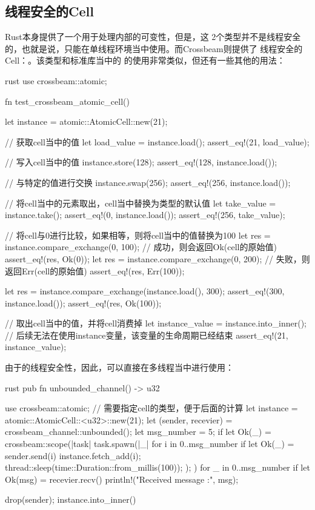 \subsection{线程安全的Cell}
Rust本身提供了一个用于处理内部的可变性，但是，这
2个类型并不是线程安全的，也就是说，只能在单线程环境当中使用。而Crossbeam则提供了
线程安全的Cell：。该类型和标准库当中的
的使用非常类似，但还有一些其他的用法：
\begin{code-block}{rust}
use crossbeam::atomic;

fn test_crossbeam_atomic_cell() {
    let instance = atomic::AtomicCell::new(21);

    // 获取cell当中的值
    let load_value = instance.load();
    assert_eq!(21, load_value);

    // 写入cell当中的值
    instance.store(128);
    assert_eq!(128, instance.load());

    // 与特定的值进行交换
    instance.swap(256);
    assert_eq!(256, instance.load());

    // 将cell当中的元素取出，cell当中替换为类型的默认值
    let take_value = instance.take();
    assert_eq!(0, instance.load());
    assert_eq!(256, take_value);

    // 将cell与0进行比较，如果相等，则将cell当中的值替换为100
    let res = instance.compare_exchange(0, 100);
    // 成功，则会返回Ok(cell的原始值)
    assert_eq!(res, Ok(0));
    let res = instance.compare_exchange(0, 200);
    // 失败，则返回Err(cell的原始值)
    assert_eq!(res, Err(100));

    let res = instance.compare_exchange(instance.load(), 300);
    assert_eq!(300, instance.load());
    assert_eq!(res, Ok(100));

    // 取出cell当中的值，并将cell消费掉
    let instance_value = instance.into_inner();
    // 后续无法在使用instance变量，该变量的生命周期已经结束
    assert_eq!(21, instance_value);
}
\end{code-block}

由于的线程安全性，因此，可以直接在多线程当中进行使用：
\begin{code-block}{rust}
pub fn unbounded_channel() -> u32 {
    use crossbeam::atomic;
    // 需要指定cell的类型，便于后面的计算
    let instance = atomic::AtomicCell::<u32>::new(21);
    let (sender, recevier) = crossbeam_channel::unbounded();
    let msg_number = 5;
    if let Ok(_) = crossbeam::scope(|task| {
        task.spawn(|_| {
            for i in 0..msg_number {
                if let Ok(_) = sender.send(i) {
                    instance.fetch_add(i);
                    thread::sleep(time::Duration::from_millis(100));
                }
            }
        });
    }) {
        for _ in 0..msg_number {
            if let Ok(msg) = recevier.recv() {
                println!("Received message :{}", msg);
            }
        }
    }

    drop(sender);
    instance.into_inner()
}
\end{code-block}

